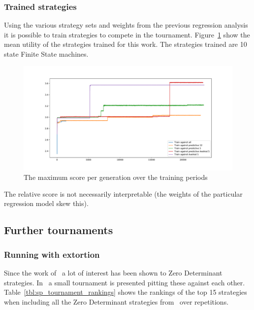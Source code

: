 \documentclass{article}
\begin{document}
\subsubsection{Trained strategies}

Using the various strategy sets and weights from the previous regression
analysis
it is possible to train strategies to compete in the tournament.
Figure~\ref{fig:training_data_max_score} show the mean utility of the strategies
trained for this work. The strategies trained are 10 state Finite State
machines.

\begin{figure}[!hbtp]
    \centering
    \includegraphics[width=.8\textwidth]{assets/training_data_max_score.pdf}
    \caption{The maximum score per generation over the training periods}
    \label{fig:training_data_max_score}
\end{figure}

The relative score is not necessarily interpretable (the weights of the
particular regression model skew this).


\subsection{Further tournaments}


\subsubsection{Running with extortion}\label{sec:run_with_stewart_plotkin}

Since the work of~\cite{Press2012} a lot of interest has been shown to Zero
Determinant strategies. In~\cite{Stewart2012} a small tournament is presented
pitting these against each other. Table~\ref{tbl:sp_tournament_rankings}
shows the rankings of the top 15 strategies when including all the Zero
Determinant strategies from~\cite{Stewart2012} over
repetitions.
\end{document}
